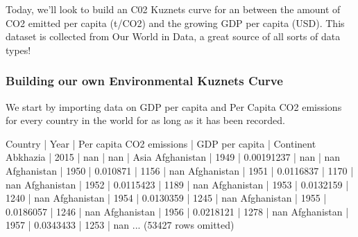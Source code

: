 \documentclass[letterpaper,10pt,english]{jupyterBook}
\begin{document}
\sphinxAtStartPar
Today, we’ll look to build an C02 Kuznets curve for an  between the amount of CO2 emitted per capita (t/CO2) and the growing GDP per capita (USD). This dataset is collected from Our World in Data, a great source of all sorts of data types!

\sphinxAtStartPar
{}


\subsubsection{Building our own Environmental Kuznets Curve}
\label{\detokenize{content/12-environmental/KuznetsHypothesis-Copy1:building-our-own-environmental-kuznets-curve}}
\sphinxAtStartPar
We start by importing data on GDP per capita and Per Capita CO2 emissions for every country in the world for as long as it has been recorded.

\begin{sphinxVerbatim}[commandchars=\\\{\}]
  
   
\end{sphinxVerbatim}

\begin{sphinxVerbatim}[commandchars=\\\{\}]
Country     | Year | Per capita CO2 emissions | GDP per capita | Continent
Abkhazia    | 2015 | nan                      | nan            | Asia
Afghanistan | 1949 | 0.00191237               | nan            | nan
Afghanistan | 1950 | 0.010871                 | 1156           | nan
Afghanistan | 1951 | 0.0116837                | 1170           | nan
Afghanistan | 1952 | 0.0115423                | 1189           | nan
Afghanistan | 1953 | 0.0132159                | 1240           | nan
Afghanistan | 1954 | 0.0130359                | 1245           | nan
Afghanistan | 1955 | 0.0186057                | 1246           | nan
Afghanistan | 1956 | 0.0218121                | 1278           | nan
Afghanistan | 1957 | 0.0343433                | 1253           | nan
... (53427 rows omitted)
\end{sphinxVerbatim}
\end{document}
